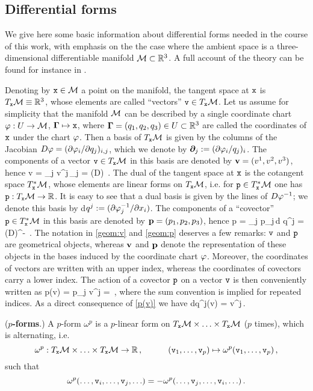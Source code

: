 \documentclass[11pt]{amsart}
\begin{document}
\subsection{Differential forms}
We give here some basic information about differential forms needed in the course of this work, 
with emphasis on the the case where the ambient space is a three-dimensional differentiable 
manifold 
$\mathcal M \subset \mathbb{R}^3$. A full account of the theory can be found for instance in 
\cite{Arnold,Frankel}. 

Denoting by $\texttt x \in \mathcal M$ a point on the manifold, the tangent space at $\texttt{x}$ is 
$T_\texttt{x}\mathcal M \equiv \mathbb{R}^3$, whose elements are called ``vectors'' $\texttt v \in 
T_\texttt{x}\mathcal M$. Let us assume for simplicity that the manifold $\mathcal M$ can be described by a single 
coordinate chart $\varphi:U\to \mathcal M$, $\boldsymbol{\Gamma} \mapsto \texttt{x}$, where $\boldsymbol{\Gamma}=(q_1,q_2,q_3)\in U\subset 
\mathbb{R}^3$ are called the 
coordinates of $\texttt{x}$ under the chart $\varphi$. Then a basis of $T_\texttt{x} \mathcal M$ is given by 
the columns of the Jacobian $D\varphi = (\partial\varphi_i/\partial q_j)_{i,j}$, which we denote by $\boldsymbol{\partial}_j := 
(\partial\varphi_i/q_j)_i$. The components of a vector $\texttt v \in T_\texttt{x}\mathcal M$ in this basis are 
denoted by $\mathbf{v} = (v^1,v^2,v^3)$, hence
\be \label{geom:v}
 \ttt v = \sum_j v^j\,\pab_j = (D\vphi) \vb\,.
\ee
The dual of the tangent space at $\texttt x$ is the cotangent space $T^*_\texttt{x}\mathcal M$, whose 
elements are linear forms on $T_\texttt{x}\mathcal M$, i.e. for $\texttt p \in 
T^*_\texttt{x}\mathcal M$ one has $\texttt p: T_\texttt{x}\mathcal M \to \mathbb{R}$. It is easy to see that a dual 
basis is given by the lines of $D\varphi^{-1}$; we denote this basis by 
d$q^j:=(\partial\varphi^{-1}_j/\partial x_i)$. The components of a ``covector'' $\texttt p \in 
T_\texttt{x}^*\mathcal M$ in this basis are denoted by $\mathbf{p} = (p_1,p_2,p_3)$, hence
\be \label{geom:p}
 \ttt p = \sum_j p_j\,\tn d q^j = (D\vphi)^{-\top} \pb\,.
\ee
The notation in \eqref{geom:v} and \eqref{geom:p} deserves a few remarks: $\texttt v$ and $\texttt 
p$ are geometrical objects, whereas $\mathbf{v}$ and $\mathbf{p}$ denote the representation of these objects in 
the bases induced by the coordinate chart $\varphi$. Moreover, the coordinates of vectors are written 
with an upper index, whereas the coordinates of covectors carry a lower index. The action of a 
covector $\texttt p$ on a vector $\texttt v$ is then conveniently written as 
\be \label{p(v)}
\ttt p(\ttt v) = p_j v^j = \pb \cdot \vb\,,
\ee
where the sum convention is implied for repeated indices. As a direct consequence of \eqref{p(v)} 
we 
have
\be
 \tn dq^j(\ttt v) = v^j\,.
\ee

\begin{definition}
 ({\bf $p$-forms}.) A $p$-form $\omega^p$ is a $p$-linear form on $T_\texttt{x}\mathcal M \times \ldots 
\times 
T_\texttt{x}\mathcal M$ ($p$ times), which is alternating, i.e.
$$
 \omega^p: T_\texttt{x}\mathcal M \times \ldots \times T_\texttt{x}\mathcal M \to \mathbb{R}\,,\qquad\quad 
(\texttt{v}_1,\ldots,\texttt{v}_p) 
\mapsto \omega^p(\texttt{v}_1,\ldots,\texttt{v}_p)\,,
$$
such that
$$
 \omega^p(\ldots,\texttt{v}_i,\ldots,\texttt{v}_j,\ldots) = - 
\omega^p(\ldots,\texttt{v}_j,\ldots,\texttt{v}_i,\ldots)\,.
$$
\end{definition}
\end{document}
